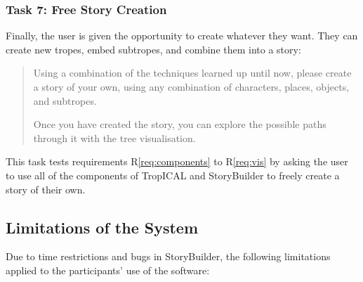 \documentclass[11pt]{report}
\begin{document}
\subsubsection*{Task 7: Free Story Creation}
\label{sec:orgeed4725}

Finally, the user is given the opportunity to create whatever they want. They
can create new tropes, embed subtropes, and combine them into a story:

\begin{framed}
\begin{quote}
Using a combination of the techniques learned up until now, please create a story of your own, using any combination of characters, places, objects, and subtropes.

Once you have created the story, you can explore the possible paths through it with the tree visualisation.
\end{quote}
\end{framed}

This task tests requirements R\ref{req:components} to R\ref{req:vis} by asking
the user to use all of the components of TropICAL and StoryBuilder to freely
create a story of their own.

\subsection{Limitations of the System}
\label{sec:limitations}

Due to time restrictions and bugs in StoryBuilder, the following limitations
applied to the participants' use of the software:
\end{document}
